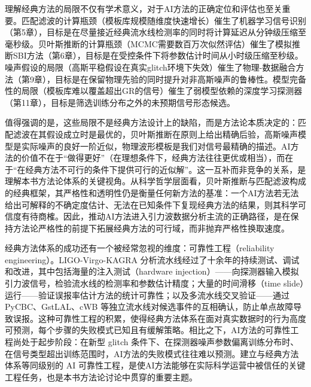 理解经典方法的局限不仅有学术意义，对于AI方法的正确定位和评估也至关重要。匹配滤波的计算瓶颈（模板库规模随维度快速增长）催生了机器学习信号识别（第5章），目标是在尽量接近经典流水线检测率的同时将计算延迟从分钟级压缩至毫秒级。贝叶斯推断的计算瓶颈（MCMC需要数百万次似然评估）催生了模拟推断SBI方法（第6章），目标是在受控条件下将参数估计时间从小时级压缩至秒级。噪声假设的局限（高斯平稳假设在真实glitch环境下失效）催生了物理-数据融合方法（第9章），目标是在保留物理先验的同时提升对非高斯噪声的鲁棒性。模型完备性的局限（模板库难以覆盖超出GR的信号）催生了弱模型依赖的深度学习探测器（第11章），目标是筛选训练分布之外的未预期信号形态候选。

值得强调的是，这些局限不是经典方法设计上的缺陷，而是方法论本质决定的：匹配滤波在其假设成立时是最优的，贝叶斯推断在原则上给出精确后验，高斯噪声模型是实际噪声的良好一阶近似，物理波形模板是我们对信号最精确的描述。AI方法的价值不在于“做得更好”（在理想条件下，经典方法往往更优或相当），而在于“在经典方法不可行的条件下提供可行的近似解”。这一互补而非竞争的关系，是理解本书方法论体系的关键视角。从科学哲学层面看，贝叶斯推断与匹配滤波构成的经典框架，其严格性和透明性仍是衡量任何新方法的基准：一个AI方法若无法给出可解释的不确定度估计、无法在已知条件下复现经典方法的结果，则其科学可信度有待商榷。因此，推动AI方法进入引力波数据分析主流的正确路径，是在保持方法论严格性的前提下拓展经典方法的可行域，而非抛弃严格性换取速度。

经典方法体系的成功还有一个被经常忽视的维度：可靠性工程（reliability engineering）。LIGO-Virgo-KAGRA 分析流水线经过了十余年的持续测试、调试和改进，其中包括海量的注入测试（hardware injection）——向探测器输入模拟引力波信号，检验流水线的检测率和参数估计精度；大量的时间滑移（time slide）运行——验证误报率估计方法的统计可靠性；以及多流水线交叉验证——通过 PyCBC、GstLAL、cWB 等独立流水线对候选事件的互相确认，防止单点故障导致误报。这种可靠性工程的积累，使得经典方法体系在面对真实数据时的行为高度可预测，每个步骤的失败模式已知且有缓解策略。相比之下，AI方法的可靠性工程尚处于起步阶段：在新型 glitch 条件下、在探测器噪声参数偏离训练分布时、在信号类型超出训练范围时，AI方法的失败模式往往难以预测。建立与经典方法体系等同级别的 AI 可靠性工程，是使AI方法能够在实际科学运营中被信任的关键工程任务，也是本书方法论讨论中贯穿的重要主题。

